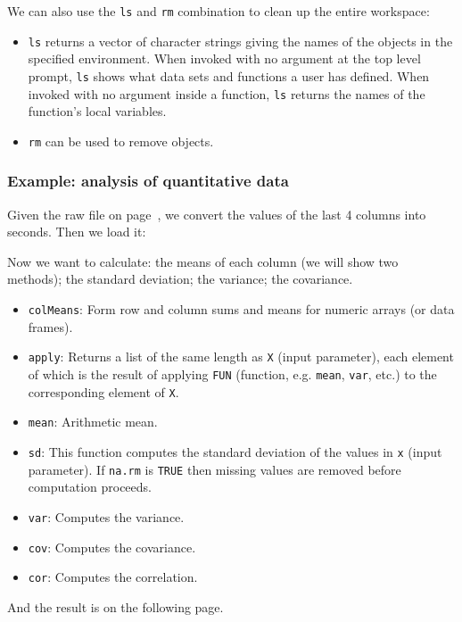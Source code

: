 \documentclass[a4paper]{article}
\begin{document}
    
    We can also use the \texttt{ls} and \texttt{rm} combination to clean up the entire workspace:
    \begin{itemize}
        \item \texttt{ls} returns a vector of character strings giving the names of the objects in the specified environment. When invoked with no argument at the top level prompt, \texttt{ls} shows what data sets and functions a user has defined. When invoked with no argument inside a function, \texttt{ls} returns the names of the function's local variables.

        \item \texttt{rm} can be used to remove objects.
    \end{itemize}
    

    \newpage

    \subsubsection{Example: analysis of quantitative data}

    Given the raw file on page~\pageref{code: read.table - raw file}, we convert the values of the last 4 columns into seconds. Then we load it:\label{code: read.table - modded}
    
    Now we want to calculate: the means of each column (we will show two methods); the standard deviation; the variance; the covariance.
    \begin{itemize}
        \item \texttt{colMeans}: Form row and column sums and means for numeric arrays (or data frames).

        \item \texttt{apply}: Returns a list of the same length as \texttt{X} (input parameter), each element of which is the result of applying \texttt{FUN} (function, e.g. \texttt{mean}, \texttt{var}, etc.) to the corresponding element of \texttt{X}.

        \item \texttt{mean}: Arithmetic mean.

        \item \texttt{sd}: This function computes the standard deviation of the values in \texttt{x} (input parameter). If \texttt{na.rm} is \texttt{TRUE} then missing values are removed before computation proceeds.
        
        \item \texttt{var}: Computes the variance.
        
        \item \texttt{cov}: Computes the covariance.
        
        \item \texttt{cor}: Computes the correlation.
    \end{itemize}
    
    And the result is on the following page.
\end{document}

